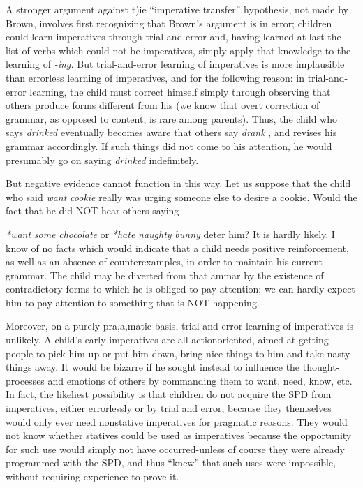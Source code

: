 A stronger argument against t)ie ``imperative transfer'' hypothesis,
not made by Brown, involves first recognizing that Brown's argument is in error; children could learn imperatives through trial and error and, having learned at last the list of verbs which could not be imperatives, simply apply that knowledge to the learning of \textit{-ing.} But trial-and-error learning of imperatives is more implausible than errorless learning of imperatives, and for the following reason: in trial-and-error learning, the child must correct himself simply through observing that others produce forms different from his (we know that overt correction of grammar, as opposed to content, is rare among parents). Thus, the child who says \textit{drinked} eventually becomes aware that others say \textit{drank} , and revises his grammar accordingly. If such things did not come to his attention, he would presumably go on saying \textit{d}\textit{rinked} indefinitely.

But negative evidence cannot function in this way. Let us sup\-pose that the child who said \textit{want} \textit{cookie} really was urging someone else to desire a cookie. Would the fact that he did NOT hear others saying

\textit{*want} \textit{some} \textit{chocolate} or \textit{*hate} \textit{naughty} \textit{bunny} deter him? It is hardly likely. I know of no facts which would indicate that a child needs positive reinforcement, as well as an absence of counterexamples, in order to maintain his current grammar. The child may be diverted from that ammar by the existence of contradictory forms to which he is obliged to pay attention; we can hardly expect him to pay atten\-tion to something that is NOT happening.

Moreover, on a purely pra,a,matic basis, trial-and-error learning of imperatives is unlikely. A child's early imperatives are all action\-oriented, aimed at getting people to pick him up or put him down, bring nice things to him and take nasty things away. It would be bizarre if he sought instead to influence the thought-processes and emotions of others by commanding them to want, need, know, etc. In fact, the likeliest possibility is that children do not acquire the SPD from imperatives, either errorlessly or by trial and error, because they them\-selves would only ever need nonstative imperatives for pragmatic reasons. They would not know whether statives could be used as imperatives because the opportunity for such use would simply not
have occurred-unless of course they were already programmed with the SPD, and thus ``knew'' that such uses were impossible, without requiring experience to prove it.

